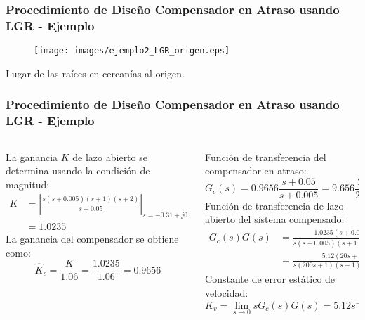 \documentclass[aspectratio=169,handout]{beamer}
\theoremstyle{definition}
\theoremstyle{plain}
\theoremstyle{remark}
\begin{document}
\begin{frame}[c]\frametitle{Procedimiento de Diseño Compensador en Atraso usando LGR - Ejemplo}
	\begin{figure}
		\centering
		\texttt{[image: images/ejemplo2\_LGR\_origen.eps]}
	\end{figure}
	\vspace*{-5mm}
	\centering \small Lugar de las raíces en cercanías al origen.
\end{frame}

\begin{frame}[c]\frametitle{Procedimiento de Diseño Compensador en Atraso usando LGR - Ejemplo}
	\small
	\vspace*{3mm}
	\begin{columns}
		\begin{column}{0.5\textwidth}
			La ganancia $K$ de lazo abierto se determina usando la condición de magnitud:
			\begin{align*}
				K &= \left| \frac{s(s+0.005)(s+1)(s+2)}{s+0.05} \right|_{s=-0.31+j0.55}\\
				&= 1.0235
			\end{align*}
			\pause
			La ganancia del compensador se obtiene como:
			\begin{equation*}
				\hat{K}_c = \frac{K}{1.06} = \frac{1.0235}{1.06} = 0.9656
			\end{equation*}
			\pause
		\end{column}
		\begin{column}{0.5\textwidth}
			Función de transferencia del compensador en atraso:
			\begin{equation*}
				G_c(s) = 0.9656\frac{s+0.05}{s+0.005} = 9.656\frac{20s+1}{200s+1}
			\end{equation*}
			\pause
			Función de transferencia de lazo abierto del sistema compensado:
			\begin{align*}
				G_c(s)G(s) &= \frac{1.0235(s+0.05)}{s(s+0.005)(s+1)(s+2)}\\
				&= \frac{5.12(20s+1)}{s(200s+1)(s+1)(0.5s+1)}
			\end{align*}
			\pause
			Constante de error estático de velocidad:
			\begin{equation*}
				K_v = \lim_{s \rightarrow 0}sG_c(s)G(s) = 5.12 s^{-1}
			\end{equation*}
		\end{column}
	\end{columns}
\end{frame}
\end{document}
